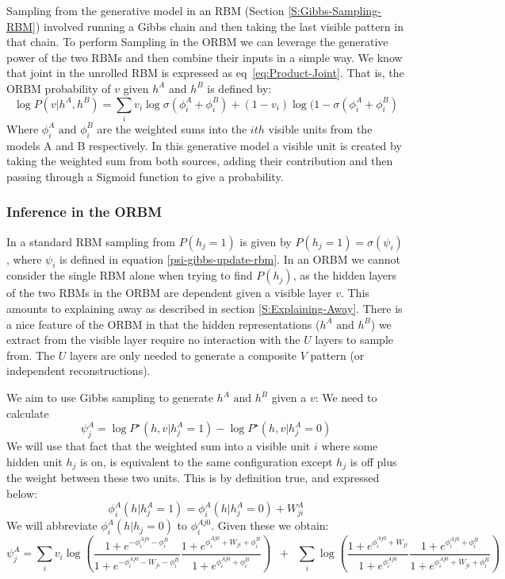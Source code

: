 Sampling from the generative model in an RBM (Section \ref{S:Gibbs-Sampling-RBM}) involved running a Gibbs chain and then taking the last visible pattern in that chain. To perform Sampling in the ORBM we can leverage the generative power of the two RBMs and then combine their inputs in a simple way.
We know that joint in the unrolled RBM is expressed as eq~\ref{eq:Product-Joint}.
That is, the ORBM probability of $v$ given $h^{A} $ and $h^{B}$ is defined by:
$$ \log P(v|h^A,h^B) = \sum_i v_i \log \sigma (\phi^A_i + \phi^B_i) + (1-v_i) \log (1 - \sigma(\phi^A_i + \phi^B_i)$$
Where $\phi_i^A \text{ and } \phi_i^B $ are the weighted sums into the $ ith$ visible units from the models A and B respectively. In this generative model a visible unit is created by taking the weighted sum from both sources, adding their contribution and then passing through a Sigmoid function to give a probability.

\subsubsection{Inference in the ORBM}\label{S:ORBM-Inference}

In a standard RBM sampling from $P(h_j=1)$ is given by $P(h_j=1) = \sigma(\psi_i)$, where $\psi_i$ is defined in equation \ref{psi-gibbs-update-rbm}. In an ORBM we cannot consider the single RBM alone when trying to find $P(h_j)$, as the hidden layers of the two RBMs in the ORBM are dependent given a visible layer $v$. This amounts to explaining away as described in section \ref{S:Explaining-Away}. There is a nice feature of the ORBM in that the hidden representations ($ h^A \text{ and } h^B $) we extract from the visible layer require no interaction with the $U$ layers to sample from. The $ U $ layers are only needed to generate a composite $ V $ pattern (or independent reconstructions).

We aim to use Gibbs sampling to generate $ h^A \text{ and } h^B $ given a $ v $:
We need to calculate
$$
\psi^A_j = \log P^\star(h,v | h^A_j = 1) - \log P^\star (h,v| h^A_j = 0)
$$
We will use that fact that the weighted sum into a visible unit $i$ where some hidden unit $h_j$ is on, is equivalent to the same configuration except $h_j$ is off plus the weight between these two units. This is by definition true, and expressed below:
$$
\phi^A_i(h | h^A_j=1) = \phi^A_i(h | h^A_j=0) + W^A_{ji}
$$
We will abbreviate $\phi^A_i(h | h_j=0)$ to $\phi^{Aj0}_i$. Given these we obtain:
$$
\psi^A_j = \sum_i v_i \log \left( \frac{1+ e^{-\phi^{Aj0}_i - \phi^B_i}}{1+e^{-\phi^{Aj0}_i - W_{ji} -\phi^B_i}} \frac{1+ e^{\phi^{Aj0}_i + W_{ji} + \phi^B_i}}{1+e^{\phi_i^{Aj0} + \phi^B_i}}\right) \;\;+ \;\;\sum_i \log \left(\frac{1+e^{\phi_i^{Aj0} + W_{ji}}}{1+ e^{\phi_i^{Aj0}}}
\frac{1+e^{\phi_i^{Aj0} + \phi^B_i}}{1+ e^{\phi_i^{Aj0} + W_{ji} + \phi^B_i}} \right)
$$

